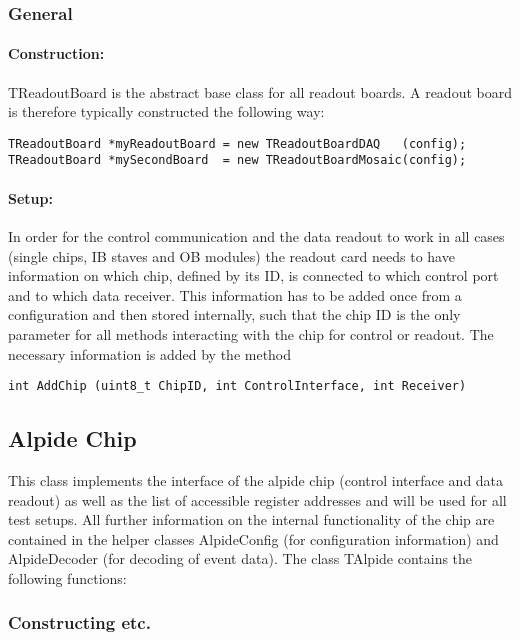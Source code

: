 \documentclass{article}
\begin{document}
\subsubsection{General}


\paragraph {Construction:}

TReadoutBoard is the abstract base class for all readout boards. A
readout board is therefore typically constructed the following way: 

\begin{verbatim}
TReadoutBoard *myReadoutBoard = new TReadoutBoardDAQ   (config);
TReadoutBoard *mySecondBoard  = new TReadoutBoardMosaic(config);
\end{verbatim}

\paragraph {Setup:}
In order for the control communication and the data readout to work in
all cases (single chips, IB staves and OB modules) the readout card
needs to have information on which chip, defined by its ID, is
connected to which control port and to which data receiver. This
information has to be added once from a configuration and then stored
internally, such that the chip ID is the only parameter for all
methods interacting with the chip for control or readout. The
necessary information is added by the method 

\begin{verbatim}
int AddChip (uint8_t ChipID, int ControlInterface, int Receiver)
\end{verbatim}



\subsection {Alpide Chip}
This class implements the interface of the alpide chip (control
interface and data readout) as well as the list of accessible register
addresses and will be used for all test setups. All further
information on the internal functionality of the chip are contained in
the helper classes AlpideConfig (for configuration information) and
AlpideDecoder (for decoding of event data). The class TAlpide
contains the following functions: 


\subsubsection {Constructing etc.}
\end{document}
